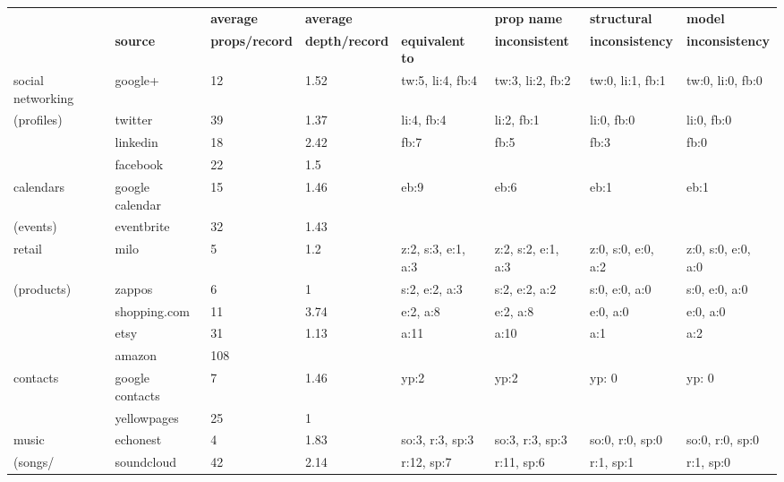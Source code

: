 \documentclass{sigchi}
\begin{document}
\begin{table}[htb]
\small
\begin{tabular}{p{2.0cm}  p{1.8cm}  p{1.8cm}  p{1.8cm}  p{1.8cm}  p{1.8cm}  p{1.8cm}  p{1.8cm}}
				&				& {\bf average}				& {\bf average }				& 				& {\bf prop name}			& {\bf structural} 			& {\bf model } \\
				& {\bf source}		& {\bf props/record}			& {\bf depth/record}			& {\bf equivalent to}	& {\bf inconsistent}			& {\bf inconsistency} 			& {\bf inconsistency} \\
\hline
social networking	& google+			& 12						& 1.52					& tw:5, li:4, fb:4		& tw:3, li:2, fb:2				& tw:0, li:1, fb:1				& tw:0, li:0, fb:0 \\
(profiles)			& twitter			& 39						& 1.37					& li:4, fb:4 			& li:2, fb:1					& li:0, fb:0					& li:0, fb:0 \\
				& linkedin			& 18						& 2.42					& fb:7			& fb:5					& fb:3					& fb:0 \\
				& facebook		& 22						& 1.5						&				&						&						& \\
\hline
calendars			& google calendar	& 15						& 1.46					& eb:9			& eb:6					& eb:1					& eb:1 \\
(events)			& eventbrite		& 32						& 1.43					&				&						& 						& \\
\hline
retail				& milo			& 5						& 1.2						& z:2, s:3, e:1, a:3	& z:2, s:2, e:1, a:3			& z:0, s:0, e:0, a:2			& z:0, s:0, e:0, a:0 \\
(products)			& zappos			& 6						& 1						& s:2, e:2, a:3		& s:2, e:2, a:2				& s:0, e:0, a:0				& s:0, e:0, a:0 \\
				& shopping.com	& 11						& 3.74					& e:2, a:8			& e:2, a:8					& e:0, a:0					& e:0, a:0 \\
				& etsy			& 31						& 1.13					& a:11			& a:10					& a:1						& a:2 \\
				& amazon			& 108					&						&				& 						&						& \\
\hline
contacts			& google contacts	& 7						& 1.46					& yp:2			& yp:2					& yp: 0					& yp: 0 \\
				& yellowpages		& 25						& 1						&				&						&						& \\
\hline
music			& echonest		& 4						& 1.83					& so:3, r:3, sp:3		& so:3, r:3, sp:3				& so:0, r:0, sp:0				& so:0, r:0, sp:0 \\
(songs/			& soundcloud		& 42						& 2.14					& r:12, sp:7		& r:11, sp:6 				& r:1, sp:1					& r:1, sp:0 \\

\end{tabular}
\end{table}
\end{document}
